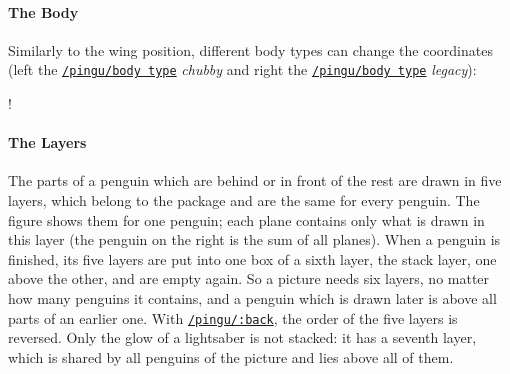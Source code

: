 \documentclass[parskip=half,english,numbers=noenddot,footnotes=nomultiple,oneside,fontsize=10pt,DIV=15,headinclude]{scrartcl}
\makeatletter
\def\pingu@listing@text{}
\def\lpingu#1{\begingroup\def\pingu@listing@text{#1}\lstinline[style=lstpingu,breakatwhitespace]'#1'\endgroup}
\newcommand*\keyref[2][/pingu/]{\hyperref[pk:#1#2]{\lpingu{#1#2}}}
\makeatother
\begin{document}
\paragraph{The Body} Similarly to the wing position, different
body types can change the coordinates (left the \keyref{body type} \textit{chubby} and right the \keyref{body type} \textit{legacy}):
\begin{center}
	\resizebox\linewidth!{%
		\quad{}
	}
\end{center}

\paragraph{The Layers}\label{internal:layers}
The parts of a penguin which are behind or in front of the rest are drawn in five layers, which belong to the package and are the same for every penguin. The figure shows them for one penguin; each plane contains only what is drawn in this layer (the penguin on the right is the sum of all planes). When a penguin is finished, its five layers are put into one box of a sixth layer, the stack layer, one above the other, and are empty again. So a picture needs six layers, no matter how many penguins it contains, and a penguin which is drawn later is above all parts of an earlier one. With \keyref{:back}, the order of the five layers is reversed. Only the glow of a lightsaber is not stacked: it has a seventh layer, which is shared by all penguins of the picture and lies above all of them.
\end{document}
